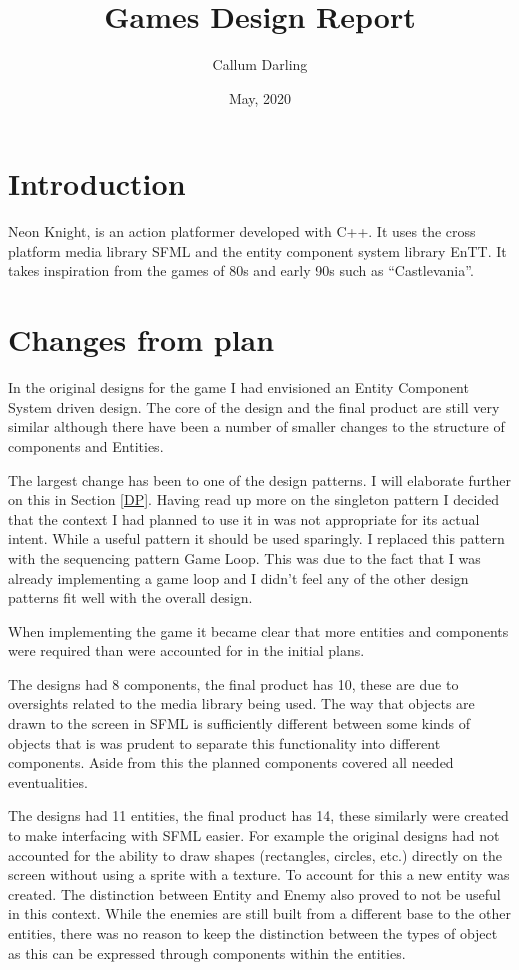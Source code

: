 \documentclass{article}
\begin{document}
\title{\vspace{-2.0cm}Games Design Report}
\author{Callum Darling}
\date{May, 2020}
\maketitle
\parskip 0.12in

\section{Introduction}

Neon Knight, is an action platformer developed with C++.
It uses the cross platform media library SFML and the entity component system library EnTT.
It takes inspiration from the games of 80s and early 90s such as ``Castlevania''. 


\section{Changes from plan} 
\label{Ch}

In the original designs for the game I had envisioned an Entity Component System driven design.
The core of the design and the final product are still very similar although there have been a number of smaller changes to the structure of components and Entities.

The largest change has been to one of the design patterns. I will elaborate further on this in Section \ref{DP}. 
Having read up more on the singleton pattern I decided
that the context I had planned to use it in was not appropriate for its actual intent. While a useful pattern it should be used sparingly. 
I replaced this pattern with the sequencing pattern Game Loop.
This was due to the fact that I was already implementing a game loop and I didn't feel any of the other design patterns fit well with the overall design. 

When implementing the game it became clear that more entities and components were required than were accounted for in the initial plans. 

The designs had 8 components, the final product has 10, these are due to oversights related to the media library being used.
The way that objects are drawn to the screen in SFML is sufficiently different between some kinds of objects that is was prudent to separate this functionality into different components.
Aside from this the planned components covered all needed eventualities.

The designs had 11 entities, the final product has 14, these similarly were created to make interfacing with SFML easier.
For example the original designs had not accounted for the ability to draw shapes (rectangles, circles, etc.) directly on the screen without using a sprite with a texture.
To account for this a new entity was created.
The distinction between Entity and Enemy also proved to not be useful in this context.
 While the enemies are still built from a different base to the other entities,
 there was no reason to keep the distinction between the types of object as this can be expressed through components within the entities.
\end{document}
